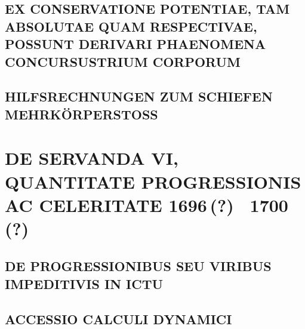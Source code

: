 \documentclass[%
fontsize=10pt,
]{scrbook}
\DeclareRobustCommand{\bracks}[1]{%
\textup{\lbrack}#1\textup{\rbrack}}
\begin{document}
\section[tocentry={Ex conservatione potentiae, tam absolutae quam respectivae, possunt derivari phaenomena concursus trium corporum
},
head={Phaenomena concursus trium corporum}]%
{\MakeUppercase{Ex conservatione potentiae, tam absolutae quam respectivae, possunt derivari phaenomena concursus\linebreak trium corporum} 
}
\label{58293}

\section[tocentry={Hilfsrechnungen zum schiefen Mehrkörperstoß},
head={Hilfsrechnungen zum schiefen Mehrkörperstoß}]
{\MakeUppercase{Hilfsrechnungen zum schiefen Mehrkörperstoß}}
\label{39763}






\chapter[tocentry={De servanda vi, quantitate progressionis ac celeritate
\enskip \bracks{1696\,(?) \textendash\ 1700\,(?)}},
head={De servanda vi, quantitate progressionis ac celeritate}]%
{\MakeUppercase{De servanda vi, quantitate progressionis ac celeritate}
\newline \bracks{1696\,(?) \textendash\ 1700\,(?)}}
\label{intro_serv-quant-progressionis}

\section[tocentry={De progressionibus seu viribus impeditivis in ictu},
head={De progressionibus seu viribus impeditivis in ictu}]%
{\MakeUppercase{De progressionibus seu viribus impeditivis in ictu}}
\label{60308}

\section[tocentry={Accessio calculi dynamici},
head={Accessio calculi dynamici}]%
{\MakeUppercase{Accessio calculi dynamici}}
\label{60307}

\end{document}
